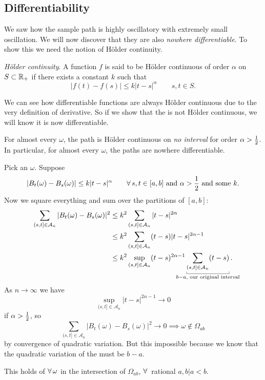 \documentclass[12pt]{report}
\begin{document}
\subsection{Differentiability}
We saw how the sample path is highly oscillatory with extremely small oscillation. We will now discover that they are also \emph{nowhere differentiable}. To show this we need the notion of Hölder continuity.
\begin{definition}
	\emph{Hölder continuity}. A function $f$ is said to be Hölder continuous of order $\alpha$ on $S\subset\mathbb{R}_{+}$ if there exists a constant $k$ such that
	\begin{equation*}
		|f(t)-f(s)|\leq k|t-s|^\alpha\qquad s,t\in S.
	\end{equation*}
\end{definition}
We can see how differentiable functions are always Hölder continuous due to the very definition of derivative. So if we show that the \bwm{} is not Hölder continuous, we will know it is now differentiable.
\begin{proposition}
	For almost every $\omega$, the \bwm{} path is Hölder continuous on \emph{no interval} for order $\alpha>\frac{1}{2}$. In particular, for almost every $\omega$, the paths are nowhere differentiable.
\end{proposition}
\begin{fancyproof}
	Pick an $\omega$. Suppose
	\begin{equation*}
		|B_{t}(\omega)-B_{s}(\omega)|\leq k|t-s|^{\alpha}\qquad\forall\, s,t\in[a,b]\text{ and }\alpha>\frac{1}{2}\text{ and some }k.
	\end{equation*}
	Now we square everything and sum over the partitions of $[a,b]$:
	\begin{align*}
		\sum_{(s,t]\in\mathcal{A}_{n}}|B_{t}(\omega)-B_{s}(\omega)|^{2}&\leq k^{2}\sum_{(s,t]\in\mathcal{A}_{n}}|t-s|^{2\alpha}\\
		&\leq k^{2}\sum_{(s,t]\in\mathcal{A}_{n}}(t-s)|t-s|^{2\alpha-1}\\
		&\leq k^{2}\sup_{(s,t]\in\mathcal{A}_{n}}(t-s)^{2\alpha -1}\ubracketthin{\sum_{(s,t]\in\mathcal{A}_{n}}(t-s)}_{\mathclap{b-a,\text{ our original interval}}}.
	\end{align*}
	As $n\to\infty$ we have $$\sup_{(s,t]\in\mathcal{A}_{n}}|t-s|^{2\alpha-1}\to0$$ if $\alpha>\frac{1}{2}$, so
	\begin{equation*}
		\sum_{(s,t]\in\mathcal{A}_{n}}|B_{t}(\omega)-B_{s}(\omega)|^{2}\to0\implies\omega\notin\Omega_{ab}
	\end{equation*}
	by convergence of quadratic variation. But this impossible because we know that the quadratic variation of the \bwm{} must be $b-a$. \par
	This holds of $\forall\,\omega$ in the intersection of $\Omega_{ab}$, $\forall\,$ rational $a,b|a<b$. 
\end{fancyproof}
\end{document}
